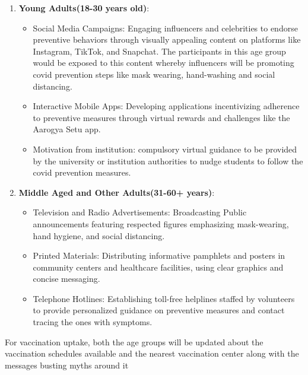 \documentclass[12pt, a4paper]{article}
\begin{document}
\begin{enumerate}
\item \vspace{-6mm} \textbf{Young Adults(18-30 years old)}:\\
\begin{itemize}
\item[\ding{109}] \vspace{-6mm} Social Media Campaigns: Engaging influencers and celebrities to endorse preventive behaviors through visually appealing content on platforms like Instagram, TikTok, and Snapchat. The participants in this age group would be exposed to this content whereby influencers will be promoting covid prevention steps like mask wearing, hand-washing and social distancing.\\
\item[\ding{109}] \vspace{-5mm} Interactive Mobile Apps: Developing applications incentivizing adherence to preventive measures through virtual rewards and challenges like the Aarogya Setu app.\\
\item[\ding{109}] \vspace{-5mm} Motivation from institution: compulsory virtual guidance to be provided by the university or institution authorities to nudge students to follow the covid prevention measures.\\
\end{itemize}
\item \vspace{-5mm} \textbf{Middle Aged and Other Adults(31-60+ years)}:\\
\begin{itemize}
\item[\ding{109}] \vspace{-6mm} Television and Radio Advertisements: Broadcasting Public announcements featuring respected figures emphasizing mask-wearing, hand hygiene, and social distancing.\\
\item[\ding{109}] \vspace{-5mm} Printed Materials: Distributing informative pamphlets and posters in community centers and healthcare facilities, using clear graphics and concise messaging.
\item[\ding{109}] \vspace{0mm} Telephone Hotlines: Establishing toll-free helplines staffed by volunteers to provide personalized guidance on preventive measures and contact tracing the ones with symptoms.\\
\end{itemize}
\end{enumerate}
\vspace{-8mm} For vaccination uptake, both the age groups will be updated about the vaccination schedules available and the nearest vaccination center along with the messages busting myths around it\\
\end{document}

